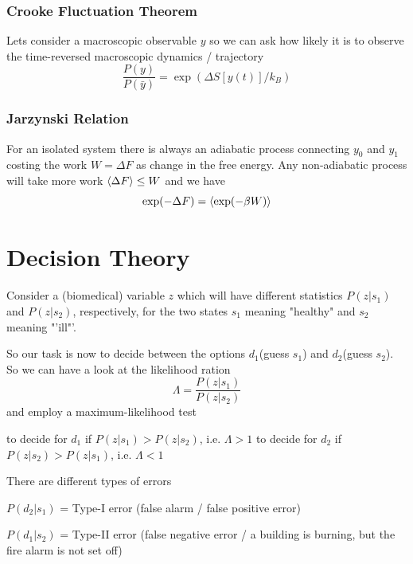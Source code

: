 \documentclass{notebook}
\begin{document}
\subsection*{Crooke Fluctuation Theorem}

Lets consider a macroscopic observable $y$ so we can ask how likely it is to observe the time-reversed macroscopic dynamics / trajectory
%
\begin{equation}
\frac{P \left( y \right)}{P \left( \bar{y} \right)} = \exp(\Delta S[y(t)] / k_B)
\end{equation}
%

\subsection*{Jarzynski Relation}

For an isolated system there is always an adiabatic process connecting $y_0$ and $y_1$ costing the work $W = \Delta F$ as change in the free energy. Any non-adiabatic process will take more work $\expval{\Delta F} \leq W$ and we have
%
\begin{equation}
	\exp(- \Delta F) = \expval{\exp(-\beta W)}
\end{equation}
%

\chapter{Decision Theory}

Consider a (biomedical) variable $z$ which will have different statistics $P(z|s_1)$ and $P(z|s_2)$, respectively, for the two states $s_1$ meaning "healthy" and $s_2$ meaning "'ill"'.

So our task is now to decide between the options $d_1$(guess $s_1$) and $d_2$(guess $s_2$). So we can have a look at the likelihood ration
%
\begin{equation}
	\Lambda = \frac{P(z|s_1)}{P(z|s_2)}
\end{equation}
%
and employ a maximum-likelihood test

to decide for $d_1$ if $P(z|s_1) > P(z|s_2)$, i.e. $\Lambda > 1$
to decide for $d_2$ if $P(z|s_2) > P(z|s_1)$, i.e. $\Lambda < 1$

There are different types of errors

$P(d_2 | s_1)$ = Type-I error (false alarm / false positive error)

$P(d_1 | s_2)$ = Type-II error (false negative error / a building is burning, but the fire alarm is not set off)
\end{document}
